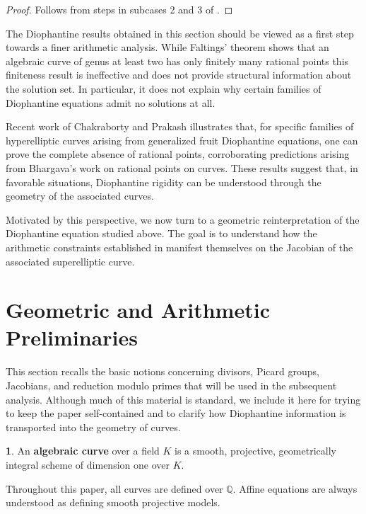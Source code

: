 \documentclass[12pt, reqno]{amsart}
\numberwithin{equation}{section}
\theoremstyle{definition}
\theoremstyle{nodefstyle}
\newtheorem*{define}{}
\begin{document}
 \begin{proof}
     Follows from steps in subcases 2 and 3 of .
 \end{proof}
 
 The Diophantine results obtained in this section should be viewed as a first step towards a
finer arithmetic analysis. While Faltings' theorem \cite{Faltings1983} shows that an algebraic curve of genus
at least two has only finitely many rational points this finiteness
result is ineffective and does not provide structural information about the solution set.
In particular, it does not explain why certain families of Diophantine equations admit no
solutions at all.

Recent work of Chakraborty and Prakash \cite{ChakrabortyPrakashFruit} illustrates that, for
specific families of hyperelliptic curves arising from generalized fruit Diophantine
equations, one can prove the complete absence of rational points, corroborating predictions
arising from Bhargava's work \cite{Bhargava2013} on rational points on curves. These results
suggest that, in favorable situations, Diophantine rigidity can be understood through the
geometry of the associated curves.

Motivated by this perspective, we now turn to a geometric reinterpretation of the
Diophantine equation studied above. The goal is to understand how the arithmetic
constraints established in  manifest themselves on the Jacobian of the associated
superelliptic curve.

\section{Geometric and Arithmetic Preliminaries}\label{sec:term}

This section recalls the basic notions concerning divisors, Picard groups, Jacobians, and
reduction modulo primes that will be used in the subsequent analysis. Although much of
this material is standard, we include it here for trying to keep the paper self-contained and to
clarify how Diophantine information is transported into the geometry of curves.
\begin{define}
An \textbf{algebraic curve} over a field $K$ is a smooth, projective, geometrically integral
scheme of dimension one over $K$.
\end{define}




Throughout this paper, all curves are defined over $\mathbb{Q}$.
Affine equations are always understood as defining smooth projective models.
\end{document}
